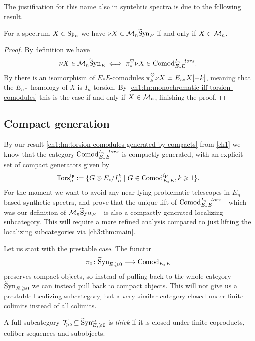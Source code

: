 The justification for this name also in syntehtic spectra is due to the following result. 

\begin{lemma}
    \label{ch3:add:lm:mono-iff-syn-mono}
    For a spectrum $X\in \mathrm{Sp}_{n}$ we have $\nu X \in \mathcal{M}_{n}\widetilde{\mathrm{S}}\mathrm{yn}_{E}$ if and only if $X\in \mathcal{M}_{n}$. 
\end{lemma}
\begin{proof}
    By definition we have 
    \[\nu X \in \mathcal{M}_{n}\widetilde{\mathrm{S}}\mathrm{yn}_{E} \iff \pi_*^\heartsuit \nu X \in \mathrm{Comod}_{E_*E}^{I_n-tors}.\]
    By \cite[4.21, 4.22]{pstragowski_2022} there is an isomorphism of $E_*E$-comodules $\pi_k^\heartsuit \nu X \simeq E_{n*} X[-k]$, meaning that the $E_{n*}$-homology of $X$ is $I_n$-torsion. By \cref{ch1:lm:monochromatic-iff-torsion-comodules} this is the case if and only if $X\in \mathcal{M}_{n}$, finishing the proof. 
\end{proof}










\subsection{Compact generation}

By our result \cref{ch1:lm:torsion-comodules-generated-by-compacts} from \cref{ch1} we know that the category $\mathrm{Comod}_{E_*E}^{I_n-tors}$ is compactly generated, with an explicit set of compact generators given by 
\[\mathrm{Tors}_n^{\mathrm{fp}} := \{G\otimes E_*/I_n^k \mid G\in \mathrm{Comod}_{E_*E}^{\mathrm{fp}}, k\geqslant 1\}.\]
For the moment we want to avoid any near-lying problematic telescopes in $E_n$-based synthetic spectra, and prove that the unique lift of $\mathrm{Comod}_{E_*E}^{I_n-tors}$---which was our definition of $\mathcal{M}_{n}\widetilde{\mathrm{S}}\mathrm{yn}_{E}$---is also a compactly generated localizing subcategory. This will require a more refined analysis compared to just lifting the localizing subcategories via \cref{ch3:thm:main}. 

Let us start with the prestable case. The functor 
\[\pi_0 \colon \widetilde{\mathrm{S}}\mathrm{yn}_{E, \geqslant 0} \longrightarrow \mathrm{Comod}_{E_*E}\]
preserves compact objects, so instead of pulling back to the whole category $\widetilde{\mathrm{S}}\mathrm{yn}_{E, \geqslant 0}$ we can instead pull back to compact objects. This will not give us a prestable localizing subcategory, but a very similar category closed under finite colimits instead of all colimits. 

\begin{definition}
    A full subcategory $\mathcal{T}_{\hspace{-1pt}\scriptscriptstyle\geqslant 0} \subseteq \widetilde{\mathrm{S}}\mathrm{yn}_{E, \geqslant 0}^\omega$ is \emph{thick} if it is closed under finite coproducts, cofiber sequences and subobjects. 
\end{definition}

